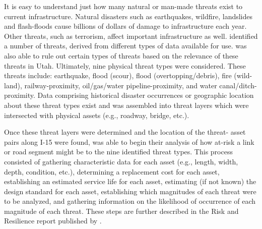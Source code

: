 It is easy to understand just how many natural or man-made threats exist to
current infrastructure. Natural disasters such as earthquakes, wildfire,
landslides and flash-floods cause billions of dollars of damage to infrastructure each year.
Other threats, such as terrorism, affect important infrastructure as well.
\citeauthor{aem2017} identified a number of threats, derived
from different types of data available for use. \citeauthor{aem2017} was
also able to rule out certain types of threats based on the relevance of these
threats in Utah. Ultimately, nine physical threat types were considered. These threats
include: earthquake, flood (scour), flood
(overtopping/debris), fire
(wild-land), railway-proximity, oil/gas/water pipeline-proximity, and water
canal/ditch-proximity. Data comprising historical disaster occurrences or
geographic location about these threat types exist and was assembled into
threat layers which were intersected with physical assets (e.g., roadway,
bridge, etc.).

Once these threat layers were determined and the location of the threat-
asset pairs along I-15
were found, \citeauthor{aem2017} was able to begin their analysis of how at-risk a link or road
segment might be to the nine identified threat types. This process consisted of
gathering characteristic
data for each asset (e.g., length, width, depth, condition, etc.), determining a
replacement cost for
each asset, establishing an estimated service life for each asset,
estimating (if not known) the
design standard for each asset, establishing which magnitudes of each
threat were to be analyzed,
and gathering information on the likelihood of occurrence of each
magnitude of each threat. These
steps are further described in the Risk and Resilience report published by \citep{aem2017}.


